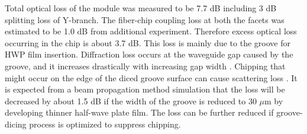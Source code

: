\documentclass[letterpaper, 10pt]{article}
\begin{document}
Total optical  loss of the module was measured to be 7.7 dB including 3 dB splitting loss of Y-branch.
The fiber-chip coupling loss at both the facets was estimated to be 1.0 dB from additional experiment.
Therefore excess optical loss occurring in the chip is about 3.7 dB.
This loss is mainly due to the groove for HWP film insertion.
Diffraction loss occurs at the waveguide gap caused by the groove, and it increases drastically with increasing gap width \cite{Inoue:1997es}.
Chipping that might occur on the edge of the diced groove surface can cause scattering loss \cite{Carpenter:2013fh}.
It is expected from a beam propagation method simulation that the loss will be decreased by about 1.5 dB if the width of the groove is reduced to 30 $\mu$m by developing thinner half-wave plate film.
The loss can be further reduced if groove-dicing process is optimized to suppress chipping.

\end{document}
